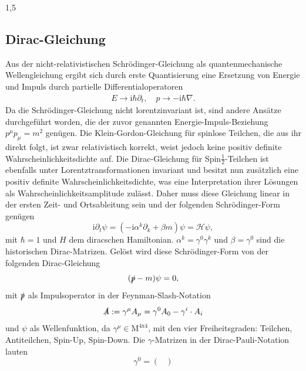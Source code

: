 \documentclass[11pt,a4paper,twoside]{report}
\begin{document}
\begin{spacing}{1,5}
\subsection{Dirac-Gleichung}
\vspace{-0.5cm}
Aus der nicht-relativistischen Schrödinger-Gleichung als quantenmechanische Wellengleichung ergibt sich durch erste Quantisierung \cite{TeilFortgeschr} eine Ersetzung von Energie 
und Impuls durch partielle Differentialoperatoren
\begin{align*}
 E \rightarrow \text{i}\hbar\partial_t, \quad p \rightarrow -\text{i}\hbar\nabla.
\end{align*}
Da die Schrödinger-Gleichung nicht lorentzinvariant ist, sind andere Ansätze durchgeführt worden, die der zuvor genannten Energie-Impuls-Beziehung $p^\mu p_\mu = m^2$
genügen. Die Klein-Gordon-Gleichung für spinlose Teilchen, die aus ihr direkt folgt, ist zwar relativistisch korrekt, weist jedoch keine positiv definite 
Wahrscheinlichkeitsdichte auf. Die Dirac-Gleichung für Spin$\frac12$-Teilchen ist ebenfalls unter Lorentztransformationen invariant und besitzt nun
zusätzlich eine positiv definite Wahrscheinlichkeitsdichte, was eine Interpretation ihrer Lösungen als Wahrscheinlichkeitsamplitude zulässt. Daher muss diese
Gleichung linear in der ersten Zeit- und Ortsableitung sein und der folgenden Schrödinger-Form genügen \cite{RelQuantMech}
\begin{equation}
 \text{i} \partial_t \psi = \left(-\text{i}\alpha^k\partial_k + \beta m\right)\psi = \mathcal{H} \psi,
 \label{eq_diracSchroedinger}
\end{equation}
mit $\hbar = 1$ und $H$ dem diracschen Hamiltonian. $\alpha^k = \gamma^0\gamma^k$ und $\beta = \gamma^0$ sind die historischen Dirac-Matrizen. Gelöst wird
diese Schrödinger-Form von der folgenden Dirac-Gleichung
\begin{equation}
 (\slashed{p} - m )\psi = 0,
 \label{eq_dirac}
\end{equation}
mit $\slashed{p}$ als Impulsoperator in der Feynman-Slash-Notation
\begin{equation}
 \slashed{A} := \gamma^\mu A_\mu = \gamma^0 A_0 - \gamma^i\cdot A_i
\end{equation}
und $\psi$ als Wellenfunktion, da $\gamma^\mu \in \text{M}^{4\text{x}4}$, mit den vier Freiheitsgraden: Teilchen, Antiteilchen, Spin-Up, Spin-Down.
Die $\gamma$-Matrizen in der Dirac-Pauli-Notation lauten
\begin{equation*}
  \gamma^0 = \begin{pmatrix} 

\end{pmatrix}
\end{equation*}
\end{spacing}
\end{document}
